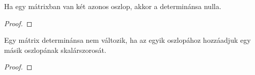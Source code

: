 \begin{statement}
  Ha egy mátrixban van két azonos oszlop, akkor a determinánsa nulla.

  \begin{proof}
    \vspace{6em}
  \end{proof}
\end{statement}

\begin{statement}
  Egy mátrix determinánsa nem változik, ha az egyik oszlopához hozzáadjuk egy
  másik oszlopának skalárszorosát.

  \begin{proof}
    \vspace{6em}
  \end{proof}
\end{statement}

